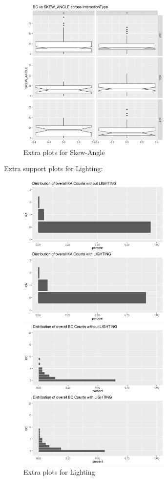 \documentclass[11pt]{scrartcl} %
\begin{document}
\begin{figure}[H]
\begin{minipage}[t]{0.5\linewidth}
\small
\end{minipage}
\begin{minipage}[t]{0.5\linewidth}
\centering
\includegraphics[width=3in]{image/extra12.png}
\small
\end{minipage}
\caption{Extra plots for Skew-Angle}
\end{figure}

Extra support plots for Lighting:
\begin{figure}[H]
\begin{minipage}[t]{0.5\linewidth}
\centering
\includegraphics[width=3in]{image/LIGHTING_all_KA.png}
\small
\end{minipage}
\begin{minipage}[t]{0.5\linewidth}
\centering
\includegraphics[width=3in]{image/LIGHTING_all_BC.png}
\small
\end{minipage}
\caption{Extra plots for Lighting}
\end{figure}
\end{document}
